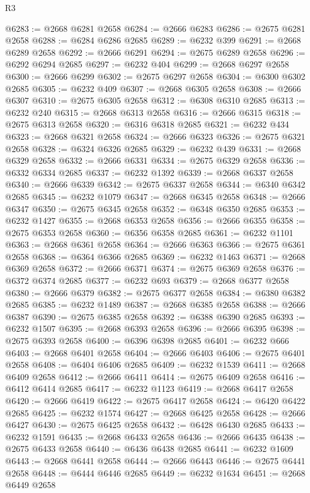 \begin{lexlean}{R3}
\begin{coremodule}
@6283 := @2668 @6281 @2658
@6284 := @2666 @6283
@6286 := @2675 @6281 @2658
@6288 := @6284 @6286 @2685
@6289 := @6232 @399
@6291 := @2668 @6289 @2658
@6292 := @2666 @6291
@6294 := @2675 @6289 @2658
@6296 := @6292 @6294 @2685
@6297 := @6232 @404
@6299 := @2668 @6297 @2658
@6300 := @2666 @6299
@6302 := @2675 @6297 @2658
@6304 := @6300 @6302 @2685
@6305 := @6232 @409
@6307 := @2668 @6305 @2658
@6308 := @2666 @6307
@6310 := @2675 @6305 @2658
@6312 := @6308 @6310 @2685
@6313 := @6232 @240
@6315 := @2668 @6313 @2658
@6316 := @2666 @6315
@6318 := @2675 @6313 @2658
@6320 := @6316 @6318 @2685
@6321 := @6232 @434
@6323 := @2668 @6321 @2658
@6324 := @2666 @6323
@6326 := @2675 @6321 @2658
@6328 := @6324 @6326 @2685
@6329 := @6232 @439
@6331 := @2668 @6329 @2658
@6332 := @2666 @6331
@6334 := @2675 @6329 @2658
@6336 := @6332 @6334 @2685
@6337 := @6232 @1392
@6339 := @2668 @6337 @2658
@6340 := @2666 @6339
@6342 := @2675 @6337 @2658
@6344 := @6340 @6342 @2685
@6345 := @6232 @1079
@6347 := @2668 @6345 @2658
@6348 := @2666 @6347
@6350 := @2675 @6345 @2658
@6352 := @6348 @6350 @2685
@6353 := @6232 @1427
@6355 := @2668 @6353 @2658
@6356 := @2666 @6355
@6358 := @2675 @6353 @2658
@6360 := @6356 @6358 @2685
@6361 := @6232 @1101
@6363 := @2668 @6361 @2658
@6364 := @2666 @6363
@6366 := @2675 @6361 @2658
@6368 := @6364 @6366 @2685
@6369 := @6232 @1463
@6371 := @2668 @6369 @2658
@6372 := @2666 @6371
@6374 := @2675 @6369 @2658
@6376 := @6372 @6374 @2685
@6377 := @6232 @693
@6379 := @2668 @6377 @2658
@6380 := @2666 @6379
@6382 := @2675 @6377 @2658
@6384 := @6380 @6382 @2685
@6385 := @6232 @1489
@6387 := @2668 @6385 @2658
@6388 := @2666 @6387
@6390 := @2675 @6385 @2658
@6392 := @6388 @6390 @2685
@6393 := @6232 @1507
@6395 := @2668 @6393 @2658
@6396 := @2666 @6395
@6398 := @2675 @6393 @2658
@6400 := @6396 @6398 @2685
@6401 := @6232 @666
@6403 := @2668 @6401 @2658
@6404 := @2666 @6403
@6406 := @2675 @6401 @2658
@6408 := @6404 @6406 @2685
@6409 := @6232 @1539
@6411 := @2668 @6409 @2658
@6412 := @2666 @6411
@6414 := @2675 @6409 @2658
@6416 := @6412 @6414 @2685
@6417 := @6232 @1123
@6419 := @2668 @6417 @2658
@6420 := @2666 @6419
@6422 := @2675 @6417 @2658
@6424 := @6420 @6422 @2685
@6425 := @6232 @1574
@6427 := @2668 @6425 @2658
@6428 := @2666 @6427
@6430 := @2675 @6425 @2658
@6432 := @6428 @6430 @2685
@6433 := @6232 @1591
@6435 := @2668 @6433 @2658
@6436 := @2666 @6435
@6438 := @2675 @6433 @2658
@6440 := @6436 @6438 @2685
@6441 := @6232 @1609
@6443 := @2668 @6441 @2658
@6444 := @2666 @6443
@6446 := @2675 @6441 @2658
@6448 := @6444 @6446 @2685
@6449 := @6232 @1634
@6451 := @2668 @6449 @2658

\end{coremodule}
\end{lexlean}
